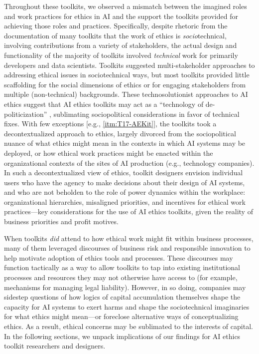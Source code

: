 \documentclass[acmsmall]{acmart}
\begin{document}
Throughout these toolkits, we observed a mismatch between the imagined roles and work practices for ethics in AI and the support the toolkits provided for achieving those roles and practices. Specifically, despite rhetoric from the documentation of many toolkits that the work of ethics is \textit{socio}technical, involving contributions from a variety of stakeholders, the actual design and functionality of the majority of toolkits involved \textit{technical} work for primarily developers and data scientists. Toolkits suggested multi-stakeholder approaches to addressing ethical issues in sociotechnical ways, but most toolkits provided little scaffolding for the social dimensions of ethics or for engaging stakeholders from multiple (non-technical) backgrounds. These technosolutionist approaches to AI ethics suggest that AI ethics toolkits may act as a ``technology of de-politicization'' \cite[cf.][]{hitzig2020normative}, sublimating sociopolitical considerations in favor of technical fixes. With few exceptions [e.g., \ref{itm:T17-AEKit}], the toolkits took a decontextualized approach to ethics, largely divorced from the sociopolitical nuance of what ethics might mean in the contexts in which AI systems may be deployed, or how ethical work practices might be enacted within the organizational contexts of the sites of AI production (e.g., technology companies). In such a decontextualized view of ethics, toolkit designers envision individual users who have the agency to make decisions about their design of AI systems, and who are not beholden to the role of power dynamics within the workplace: organizational hierarchies, misaligned priorities, and incentives for ethical work practices---key considerations for the use of AI ethics toolkits, given the reality of business priorities and profit motives. 

When toolkits \textit{did} attend to how ethical work might fit within business processes, many of them leveraged discourses of business risk and responsible innovation to help motivate adoption of ethics tools and processes. These discourses may function tactically \cite[cf.][]{wong2021tactics} as a way to allow toolkits to tap into existing institutional processes and resources they may not otherwise have access to (for example, mechanisms for managing legal liability). However, in so doing, companies may sidestep questions of how logics of capital accumulation themselves shape the capacity for AI systems to exert harms and shape the sociotechnical imaginaries \cite[cf.][]{jasanoff2015dreamscapes} for what ethics might mean---or foreclose alternative ways of conceptualizing ethics. As a result, ethical concerns may be sublimated to the interests of capital. In the following sections, we unpack implications of our findings for AI ethics toolkit researchers and designers.
\end{document}
